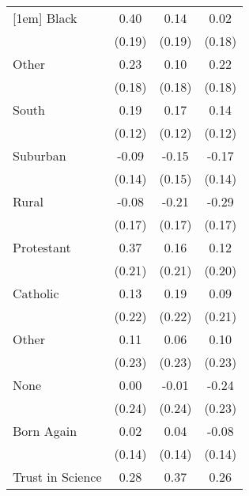 \begin{table}[htbp]
\begin{tabular}{l*{3}{c}}
[1em]
Black               &        0.40\sym{*} &        0.14        &        0.02        \\
                    &      (0.19)        &      (0.19)        &      (0.18)        \\
[1em]
Other               &        0.23        &        0.10        &        0.22        \\
                    &      (0.18)        &      (0.18)        &      (0.18)        \\
[1em]
South               &        0.19        &        0.17        &        0.14        \\
                    &      (0.12)        &      (0.12)        &      (0.12)        \\
[1em]
Suburban            &       -0.09        &       -0.15        &       -0.17        \\
                    &      (0.14)        &      (0.15)        &      (0.14)        \\
[1em]
Rural               &       -0.08        &       -0.21        &       -0.29        \\
                    &      (0.17)        &      (0.17)        &      (0.17)        \\
[1em]
Protestant          &        0.37        &        0.16        &        0.12        \\
                    &      (0.21)        &      (0.21)        &      (0.20)        \\
[1em]
Catholic            &        0.13        &        0.19        &        0.09        \\
                    &      (0.22)        &      (0.22)        &      (0.21)        \\
[1em]
Other               &        0.11        &        0.06        &        0.10        \\
                    &      (0.23)        &      (0.23)        &      (0.23)        \\
[1em]
None                &        0.00        &       -0.01        &       -0.24        \\
                    &      (0.24)        &      (0.24)        &      (0.23)        \\
[1em]
Born Again          &        0.02        &        0.04        &       -0.08        \\
                    &      (0.14)        &      (0.14)        &      (0.14)        \\
[1em]
Trust in Science    &        0.28\sym{**}&        0.37\sym{**}&        0.26\sym{**}\\

\end{tabular}
\end{table}
